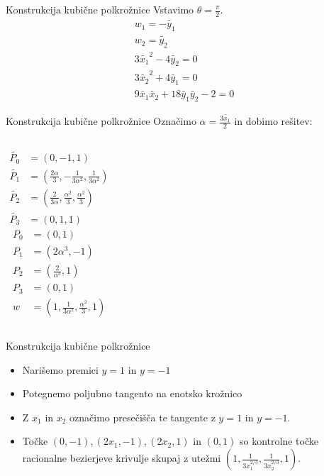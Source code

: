 \documentclass[t]{beamer}
\begin{document}
\begin{frame}{Konstrukcija kubične polkrožnice}
Vstavimo $\theta = \frac{\pi}{2}$.
\begin{align*}
w_{1} = - \tilde{y_{1}} \\
w_{2} = \tilde{y_{2}} \\
3\tilde{x_{1}}^2 - 4 \tilde{y_{2}} = 0 \\
3 \tilde{x_{2}}^2 + 4 \tilde{y_{1}} = 0 \\
9 \tilde{x_{1}} \tilde{x_{2}} + 18 \tilde{y_{1}} \tilde{y_{2}} - 2 = 0
\end{align*}
\end{frame}
\begin{frame}{Konstrukcija kubične polkrožnice}
Označimo $\alpha = \frac{3\tilde{x_{1}}}{2}$ in dobimo rešitev:

\begin{columns}
\begin{align*}
\tilde{P_{0}} &= (0,-1,1) \\
\tilde{P_{1}} &= (\frac{2\alpha}{3},-\frac{1}{3\alpha^2},\frac{1}{3\alpha^2}) \\
\tilde{P_{2}} &= (\frac{2}{3\alpha},\frac{\alpha^2}{3}, \frac{\alpha^2}{3}) \\
\tilde{P_{3}} &= (0, 1,1)
\end{align*}
\begin{align*}
P_{0} &= (0,1) \\
P_{1} &= (2\alpha^3, -1) \\
P_{2} &= (\frac{2}{\alpha^3}, 1) \\
P_{3} &= (0, 1) \\
w &= (1, \frac{1}{3\alpha^2}, \frac{\alpha^2}{3}, 1)
\end{align*}
\end{columns}

\end{frame}
\begin{frame}{Konstrukcija kubične polkrožnice}
\begin{itemize}
\item Narišemo premici $y=1$ in $y = -1$
\item Potegnemo poljubno tangento na enotsko krožnico
\item Z $x_{1}$ in $x_{2}$ označimo presečišča te tangente z $y=1$ in $y=-1$.
\item Točke $(0,-1), (2x_{1}, -1), (2x_{2}, 1)$ in $(0,1)$ so kontrolne točke racionalne bezierjeve krivulje skupaj z utežmi $(1, \frac{1}{3x_{1}^{2/3}}, \frac{1}{3x_{2}^{2/3}}, 1)$.

\end{itemize}
\end{frame}
\end{document}
